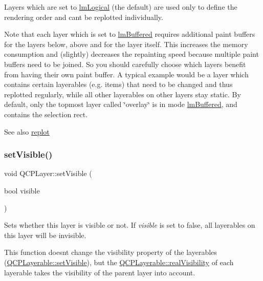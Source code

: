 Layers which are set to \mbox{\hyperlink{class_q_c_p_layer_a67dcfc1590be2a1f2227c5a39bb59c7ca02eb5e9a4cb7f1baf1e2b6b99e3b87ce}{lm\+Logical}} (the default) are used only to define the rendering order and can\textquotesingle{}t be replotted individually.

Note that each layer which is set to \mbox{\hyperlink{class_q_c_p_layer_a67dcfc1590be2a1f2227c5a39bb59c7cab581b9fab3007c4c65f057f4185d7538}{lm\+Buffered}} requires additional paint buffers for the layers below, above and for the layer itself. This increases the memory consumption and (slightly) decreases the repainting speed because multiple paint buffers need to be joined. So you should carefully choose which layers benefit from having their own paint buffer. A typical example would be a layer which contains certain layerables (e.\+g. items) that need to be changed and thus replotted regularly, while all other layerables on other layers stay static. By default, only the topmost layer called \char`\"{}overlay\char`\"{} is in mode \mbox{\hyperlink{class_q_c_p_layer_a67dcfc1590be2a1f2227c5a39bb59c7cab581b9fab3007c4c65f057f4185d7538}{lm\+Buffered}}, and contains the selection rect.

\begin{DoxySeeAlso}{See also}
\mbox{\hyperlink{class_q_c_p_layer_adefd53b6db02f470151c416f42e37180}{replot}} 
\end{DoxySeeAlso}
\mbox{\label{class_q_c_p_layer_ac07671f74edf6884b51a82afb2c19516}} 
\subsubsection{\texorpdfstring{setVisible()}{setVisible()}}
{\footnotesize\ttfamily void Q\+C\+P\+Layer\+::set\+Visible (\begin{DoxyParamCaption}\item[{bool}]{visible }\end{DoxyParamCaption})}

Sets whether this layer is visible or not. If {\itshape visible} is set to false, all layerables on this layer will be invisible.

This function doesn\textquotesingle{}t change the visibility property of the layerables (\mbox{\hyperlink{class_q_c_p_layerable_a3bed99ddc396b48ce3ebfdc0418744f8}{Q\+C\+P\+Layerable\+::set\+Visible}}), but the \mbox{\hyperlink{class_q_c_p_layerable_ab054e88f15d485defcb95e7376f119e7}{Q\+C\+P\+Layerable\+::real\+Visibility}} of each layerable takes the visibility of the parent layer into account. \mbox{\label{class_q_c_p_layer_ad1cc2d6b32d2abb33c7f449b964e068c}} 

